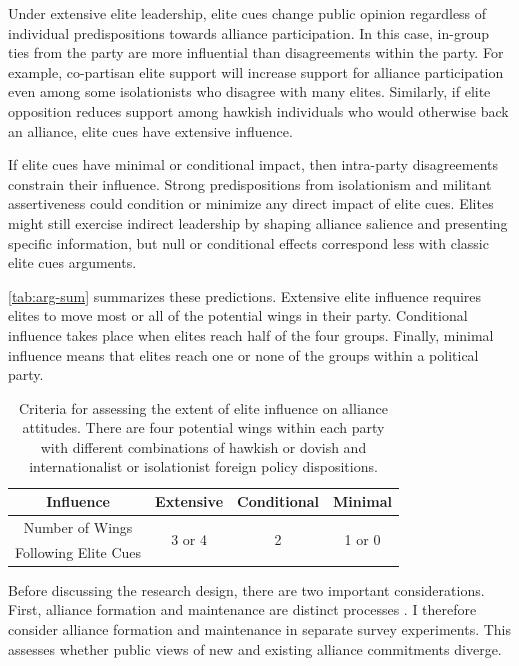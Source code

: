 \documentclass[12pt]{article}
\begin{document}
Under extensive elite leadership, elite cues change public opinion regardless of individual predispositions towards alliance participation. 
In this case, in-group ties from the party are more influential than disagreements within the party. 
For example, co-partisan elite support will increase support for alliance participation even among some isolationists who disagree with many elites. 
Similarly, if elite opposition reduces support among hawkish individuals who would otherwise back an alliance, elite cues have extensive influence. 


If elite cues have minimal or conditional impact, then intra-party disagreements constrain their influence.
Strong predispositions from isolationism and militant assertiveness could condition or minimize any direct impact of elite cues.
Elites might still exercise indirect leadership by shaping alliance salience and presenting specific information, but null or conditional effects correspond less with classic elite cues arguments. 


\autoref{tab:arg-sum} summarizes these predictions. 
Extensive elite influence requires elites to move most or all of the potential wings in their party. 
Conditional influence takes place when elites reach half of the four groups. 
Finally, minimal influence means that elites reach one or none of the groups within a political party.


\begin{table}[hbt!]
\begin{center}
\begin{tabular}{| c | c | c | c |}
\hline
   Influence          & Extensive & Conditional & Minimal  \\
\hline
   Number of Wings   & \multirow{2}{*}{3 or 4}  & \multirow{2}{*}{2}  & \multirow{2}{*}{1 or 0} \\
   Following Elite Cues     &           &             &  \\
\hline
\end{tabular}
\caption{Criteria for assessing the extent of elite influence on alliance attitudes. There are four potential wings within each party with different combinations of hawkish or dovish and internationalist or isolationist foreign policy dispositions.}
\label{tab:arg-sum}
\end{center} 
\end{table}



Before discussing the research design, there are two important considerations. 
First, alliance formation and maintenance are distinct processes \citep{Snyder1997}. 
I therefore consider alliance formation and maintenance in separate survey experiments.
This assesses whether public views of new and existing alliance commitments diverge. 
\end{document}
